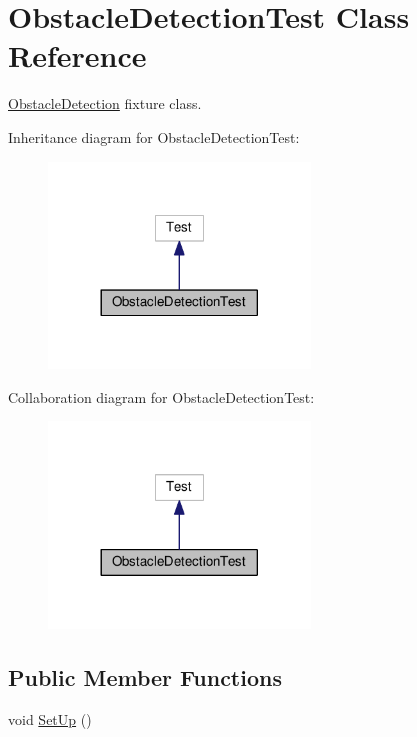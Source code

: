 \hypertarget{classObstacleDetectionTest}{}\section{Obstacle\+Detection\+Test Class Reference}
\label{classObstacleDetectionTest}


\hyperlink{classObstacleDetection}{Obstacle\+Detection} fixture class.  




Inheritance diagram for Obstacle\+Detection\+Test\+:
\nopagebreak
\begin{figure}[H]
\begin{center}
\leavevmode
\includegraphics[width=197pt]{classObstacleDetectionTest__inherit__graph}
\end{center}
\end{figure}


Collaboration diagram for Obstacle\+Detection\+Test\+:
\nopagebreak
\begin{figure}[H]
\begin{center}
\leavevmode
\includegraphics[width=197pt]{classObstacleDetectionTest__coll__graph}
\end{center}
\end{figure}
\subsection*{Public Member Functions}
\begin{DoxyCompactItemize}
\item 
void \hyperlink{classObstacleDetectionTest_af8f279787b436f2ee1c84de7eab1df27}{Set\+Up} ()
\end{DoxyCompactItemize}
